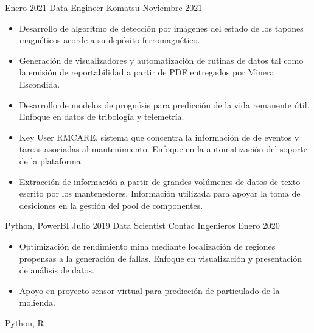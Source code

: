 \begin{experiences}
    \experience
        {Enero 2021}
        {Data Engineer}
        {Komatsu}
        {Noviembre 2021}
        {
            \begin{itemize}
            \item Desarrollo de algoritmo de detección por imágenes del estado de los tapones magnéticos acorde a su depósito ferromagnético.
            \item Generación de visualizadores y automatización de rutinas de datos tal como la emisión de reportabilidad a partir de PDF entregados por Minera Escondida.
            \item Desarrollo de modelos de prognósis para predicción de la vida remanente útil. Enfoque en datos de tribología y telemetría.
            \item Key User RMCARE, sistema que concentra la información de de eventos y tareas asociadas al mantenimiento. Enfoque en la automatización del soporte de la plataforma. 
            \item Extracción de información a partir de grandes volúmenes de datos de texto escrito por los mantenedores. Información utilizada para apoyar la toma de desiciones en la gestión del pool de componentes.
            \end{itemize}
        }
        {
            Python,
            PowerBI
        }
        \experience
        {Julio 2019}
        {Data Scientist}
        {Contac Ingenieros}
        {Enero 2020}
        {
            \begin{itemize}
                \item Optimización de rendimiento mina mediante localización de regiones propensas a la generación de fallas. Enfoque en visualización y presentación de análisis de datos.
                \item Apoyo en proyecto sensor virtual para predicción de particulado de la molienda.
            \end{itemize}
        }
        {
            Python,
            R
        }
            


\end{experiences}
